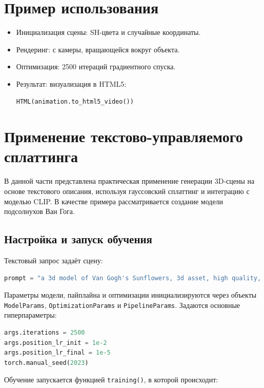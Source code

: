 \section{Пример использования}

\begin{itemize}
    \item Инициализация сцены: SH-цвета и случайные координаты.
    \item Рендеринг: с камеры, вращающейся вокруг объекта.
    \item Оптимизация: 2500 итераций градиентного спуска.
    \item Результат: визуализация в HTML5:
    \begin{lstlisting}[language=Python]
HTML(animation.to_html5_video())
    \end{lstlisting}
\end{itemize}
\section{Применение текстово-управляемого сплаттинга}

В данной части представлена практическая применение генерации 3D-сцены на основе текстового описания, используя гауссовский сплаттинг и интеграцию с моделью CLIP. В качестве примера рассматривается создание модели подсолнухов Ван Гога.

\subsection{Настройка и запуск обучения}

Текстовый запрос задаёт сцену: 

\begin{lstlisting}[language=Python]
prompt = "a 3d model of Van Gogh's Sunflowers, 3d asset, high quality, not noisy, beautiful, black background"
\end{lstlisting}

Параметры модели, пайплайна и оптимизации инициализируются через объекты \texttt{ModelParams}, \texttt{OptimizationParams} и \texttt{PipelineParams}. Задаются основные гиперпараметры:

\begin{lstlisting}[language=Python]
args.iterations = 2500
args.position_lr_init = 1e-2
args.position_lr_final = 1e-5
torch.manual_seed(2023)
\end{lstlisting}

Обучение запускается функцией \texttt{training()}, в которой происходит:

